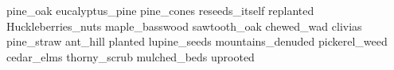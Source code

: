 pine\_oak eucalyptus\_pine pine\_cones reseeds\_itself replanted Huckleberries\_nuts maple\_basswood sawtooth\_oak chewed\_wad clivias pine\_straw ant\_hill planted lupine\_seeds mountains\_denuded pickerel\_weed cedar\_elms thorny\_scrub mulched\_beds uprooted 
